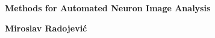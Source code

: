 \documentclass[12pt, oneside]{report}
\begin{document}
	\pagecolor{background}%
	\BgThispage
	\thispagestyle{empty}
	\begin{center}
		{\Huge\bf Methods for Automated Neuron Image Analysis\\}%
	\end{center}
	\vfill
	\begin{center}
		{\Large\bf Miroslav Radojevi\'{c}}
	\end{center}
\end{document}
